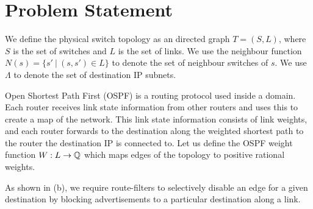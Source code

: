 \section{Problem Statement}
We define the physical switch topology as an directed graph $T=(S, L)$,
where $S$ is the set of switches and $L$ is the set of links. 
We use the neighbour function $N(s) = \{s'\ | \ (s,s') \in L \}$ to denote 
the set of neighbour switches of $s$. 
We use $\Lambda$ to denote the set of destination IP subnets.

Open Shortest Path First (OSPF) is a routing protocol used inside a
domain. Each router receives link state information from other routers
and uses this to create a map of the network. This link state
information consists of link weights, and each router
forwards to the destination along the weighted shortest path 
to the router the destination IP is connected to. Let us
define the OSPF weight function $W: L \rightarrow \mathbb{Q}$ which 
maps edges of the topology to positive rational weights. 

As shown in (b), 
we require route-filters
to selectively disable an
edge for a given destination by  blocking advertisements to a
particular destination along a link. 
